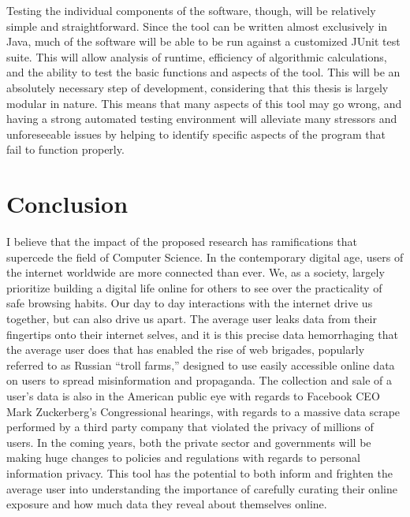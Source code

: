 \documentclass[11pt]{article}
\begin{document}
Testing the individual components of the software, though, will be relatively simple and straightforward. Since the tool can be written almost exclusively in Java, much of the software will be able to be run against a customized JUnit test suite. This will allow analysis of runtime, efficiency of algorithmic calculations, and the ability to test the basic functions and aspects of the tool. This will be an absolutely necessary step of development, considering that this thesis is largely modular in nature. This means that many aspects of this tool may go wrong, and having a strong automated testing environment will alleviate many stressors and unforeseeable issues by helping to identify specific aspects of the program that fail to function properly. 

\vspace*{-.1in}
\section{Conclusion}
\label{sec:conclusion}
\vspace*{-.1in}


I believe that the impact of the proposed research has ramifications that supercede the field of Computer Science. In the contemporary digital age, users of the internet worldwide are more connected than ever. We, as a society, largely prioritize building a digital life online for others to see over the practicality of safe browsing habits. Our day to day interactions with the internet drive us together, but can also drive us apart. The average user leaks data from their fingertips onto their internet selves, and it is this precise data hemorrhaging that the average user does that has enabled the rise of web brigades, popularly referred to as Russian ``troll farms,'' designed to use easily accessible online data on users to spread misinformation and propaganda. The collection and sale of a user's data is also in the American public eye with regards to Facebook CEO Mark Zuckerberg's Congressional hearings, with regards to a massive data scrape performed by a third party company that violated the privacy of millions of users. In the coming years, both the private sector and governments will be making huge changes to policies and regulations with regards to personal information privacy. This tool has the potential to both inform and frighten the average user into understanding the importance of carefully curating their online exposure and how much data they reveal about themselves online.
\end{document}
